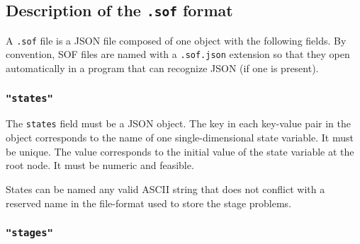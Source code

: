 \documentclass[final,1p,times]{elsarticle}
\begin{document}
\subsection{Description of the \texttt{.sof} format}

A \texttt{.sof} file is a JSON file composed of one object with the following fields. By convention, SOF files are named with a \texttt{.sof.json} extension so that they open automatically in a program that can recognize JSON (if one is present).

\subsubsection{\texttt{"states"}}\label{sec:sof_states}

The \texttt{states} field must be a JSON object. The key in each key-value pair in the object corresponds to the name of one single-dimensional state variable. It must be unique. The value corresponds to the initial value of the state variable at the root node. It must be numeric and feasible.

States can be named any valid ASCII string that does not conflict with a reserved name in the file-format used to store the stage problems.

\subsubsection{\texttt{"stages"}}\label{sec:sof_stages}
\end{document}
